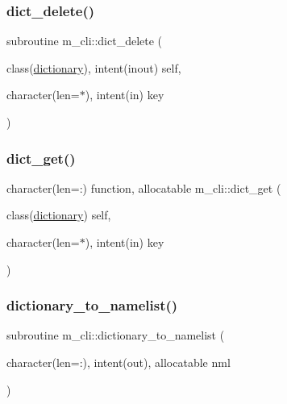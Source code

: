 \subsubsection{\texorpdfstring{dict\+\_\+delete()}{dict\_delete()}}
{\footnotesize\ttfamily subroutine m\+\_\+cli\+::dict\+\_\+delete (\begin{DoxyParamCaption}\item[{class(\mbox{\hyperlink{structm__cli_1_1dictionary}{dictionary}}), intent(inout)}]{self,  }\item[{character(len=$\ast$), intent(in)}]{key }\end{DoxyParamCaption})\hspace{0.3cm}{\ttfamily [private]}}

\mbox{\label{namespacem__cli_ac4a889309ffc333af6bf8e11f1fc4869}} 
\subsubsection{\texorpdfstring{dict\+\_\+get()}{dict\_get()}}
{\footnotesize\ttfamily character(len=\+:) function, allocatable m\+\_\+cli\+::dict\+\_\+get (\begin{DoxyParamCaption}\item[{class(\mbox{\hyperlink{structm__cli_1_1dictionary}{dictionary}})}]{self,  }\item[{character(len=$\ast$), intent(in)}]{key }\end{DoxyParamCaption})\hspace{0.3cm}{\ttfamily [private]}}

\mbox{\label{namespacem__cli_a7e5041efcad56387232475a3ae728634}} 
\subsubsection{\texorpdfstring{dictionary\+\_\+to\+\_\+namelist()}{dictionary\_to\_namelist()}}
{\footnotesize\ttfamily subroutine m\+\_\+cli\+::dictionary\+\_\+to\+\_\+namelist (\begin{DoxyParamCaption}\item[{character(len=\+:), intent(out), allocatable}]{nml }\end{DoxyParamCaption})\hspace{0.3cm}{\ttfamily [private]}}



